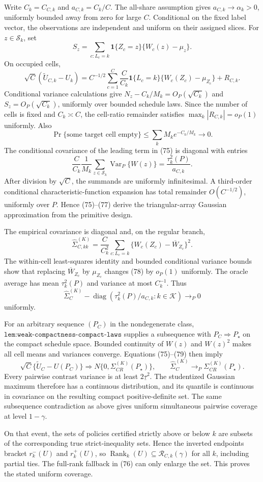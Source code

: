 Write \(C_k=C_{C,k}\) and \(a_{C,k}=C_k/C\).  The all-share assumption gives \(a_{C,k}\to\alpha_k>0\), uniformly bounded away from zero for large \(C\).  Conditional on the fixed label vector, the observations are independent and uniform on their assigned slices.  For \(z\in\mathcal S_k\), set
\[
S_z=\sum_{c:L_c=k}\mathbf1\{Z_c=z\}\{W_c(z)-\mu_z\}.
\]
On occupied cells,
\[
\sqrt C(\widetilde U_{C,k}-U_k)
=C^{-1/2}\sum_{c=1}^C\frac{C}{C_k}\mathbf1\{L_c=k\}
\{W_c(Z_c)-\mu_{Z_c}\}+R_{C,k}. \tag{75}
\]
Conditional variance calculations give \(N_z-C_k/M_k=O_P(\sqrt{C_k})\) and \(S_z=O_P(\sqrt{C_k})\), uniformly over bounded schedule laws.  Since the number of cells is fixed and \(C_k\asymp C\), the cell-ratio remainder satisfies \(\max_k|R_{C,k}|=o_P(1)\) uniformly.  Also
\[
\Pr\{\text{some target cell empty}\}
\leq\sum_kM_ke^{-C_k/M_k}\to0. \tag{76}
\]
The conditional covariance of the leading term in (75) is diagonal with entries
\[
\frac{C}{C_k}\frac1{M_k}\sum_{z\in\mathcal S_k}\operatorname{Var}_P\{W(z)\}
=\frac{\tau_k^2(P)}{a_{C,k}}. \tag{77}
\]
After division by \(\sqrt C\), the summands are uniformly infinitesimal.  A third-order conditional characteristic-function expansion has total remainder \(O(C^{-1/2})\), uniformly over \(P\).  Hence (75)--(77) derive the triangular-array Gaussian approximation from the primitive design.

The empirical covariance is diagonal and, on the regular branch,
\[
\widehat\Sigma_{C,kk}^{(K)}
=\frac{C}{C_k^2}\sum_{c:L_c=k}\{W_c(Z_c)-\overline W_{Z_c}\}^2. \tag{78}
\]
The within-cell least-squares identity and bounded conditional variance bounds show that replacing \(\overline W_{Z_c}\) by \(\mu_{Z_c}\) changes (78) by \(o_P(1)\) uniformly.  The oracle average has mean \(\tau_k^2(P)\) and variance at most \(C_k^{-1}\).  Thus
\[
\widehat\Sigma_C^{(K)}-
\operatorname{diag}(\tau_k^2(P)/a_{C,k}:k\in\mathcal K)\to_P0 \tag{79}
\]
uniformly.

For an arbitrary sequence \((P_C)\) in the nondegenerate class, \(\texttt{lem:weak-compactness-compact-laws}\) supplies a subsequence with \(P_C\Rightarrow P_\star\) on the compact schedule space.  Bounded continuity of \(W(z)\) and \(W(z)^2\) makes all cell means and variances converge.  Equations (75)--(79) then imply
\[
\sqrt C\{\widetilde U_C-U(P_C)\}\Rightarrow
N\{0,\Sigma_{CR}^{(K)}(P_\star)\},\qquad
\widehat\Sigma_C^{(K)}\to_P\Sigma_{CR}^{(K)}(P_\star). \tag{80}
\]
Every pairwise contrast variance is at least \(2\underline\tau^2\).  The studentized Gaussian maximum therefore has a continuous distribution, and its quantile is continuous in covariance on the resulting compact positive-definite set.  The same subsequence contradiction as above gives uniform simultaneous pairwise coverage at level \(1-\gamma\).

On that event, the sets of policies certified strictly above or below \(k\) are subsets of the corresponding true strict-inequality sets.  Hence the inverted endpoints bracket \(r_k^-(U)\) and \(r_k^+(U)\), so \(\operatorname{Rank}_k(U)\subseteq\mathcal R_{C,k}(\gamma)\) for all \(k\), including partial ties.  The full-rank fallback in (76) can only enlarge the set.  This proves the stated uniform coverage.